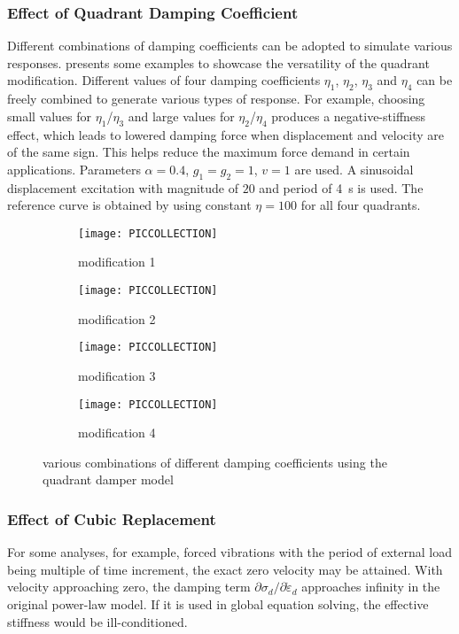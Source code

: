 \subsubsection{Effect of Quadrant Damping Coefficient}
Different combinations of damping coefficients can be adopted to simulate various responses.  presents some examples to showcase the versatility of the quadrant modification. Different values of four damping coefficients $\eta_1$, $\eta_2$, $\eta_3$ and $\eta_4$ can be freely combined to generate various types of response. For example, choosing small values for $\eta_1$/$\eta_3$ and large values for $\eta_2$/$\eta_4$ produces a negative-stiffness effect, which leads to lowered damping force when displacement and velocity are of the same sign. This helps reduce the maximum force demand in certain applications. Parameters $\alpha=0.4$, $g_1=g_2=1$, $v=1$ are used. A sinusoidal displacement excitation with magnitude of $20$ and period of \SI{4}{\second} is used. The reference curve is obtained by using constant $\eta=100$ for all four quadrants.
\begin{figure}[htb]
\centering\scriptsize
\begin{subfigure}{.49\textwidth}\centering
\texttt{[image: PICCOLLECTION]}
\caption{modification 1}\label{fig:mod_a}
\end{subfigure}\hfill
\begin{subfigure}{.49\textwidth}\centering
\texttt{[image: PICCOLLECTION]}
\caption{modification 2}\label{fig:mod_b}
\end{subfigure}
\begin{subfigure}{.49\textwidth}\centering
\texttt{[image: PICCOLLECTION]}
\caption{modification 3}\label{fig:mod_c}
\end{subfigure}\hfill
\begin{subfigure}{.49\textwidth}\centering
\texttt{[image: PICCOLLECTION]}
\caption{modification 4}\label{fig:mod_d}
\end{subfigure}
\caption{various combinations of different damping coefficients using the quadrant damper model}\label{fig:mod}
\end{figure}
\subsubsection{Effect of Cubic Replacement}
For some analyses, for example, forced vibrations with the period of external load being multiple of time increment, the exact zero velocity may be attained. With velocity approaching zero, the damping term $\partial\sigma_d/\partial\dot\varepsilon_d$ approaches infinity in the original power-law model. If it is used in global equation solving, the effective stiffness would be ill-conditioned.

